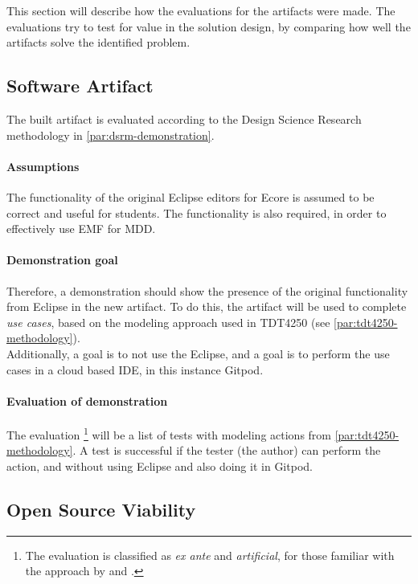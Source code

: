 
This section will describe how the evaluations for the artifacts were made.
The evaluations try to test for value in the solution design, by comparing how well the artifacts solve the identified problem.

\subsection{Software Artifact}

The built artifact is evaluated according to the Design Science Research methodology in \cref{par:dsrm-demonstration}.

\paragraph{Assumptions}
The functionality of the original \gls{Eclipse} editors for \gls{Ecore} is assumed to be correct and useful for students.
The functionality is also required, in order to effectively use \acrshort{EMF} for \acrfull{MDD}.

\paragraph{Demonstration goal}
Therefore, a demonstration should show the presence of the original functionality from \gls{Eclipse} in the new artifact.
To do this, the artifact will be used to complete \textit{use cases}, based on the modeling approach used in \gls{TDT4250} (see \cref{par:tdt4250-methodology}).\\


Additionally, a goal is to not use the \gls{Eclipse}, and a goal is to perform the use cases in a \gls{cloud} based \gls{IDE}, in this instance \gls{Gitpod}.


\paragraph{Evaluation of demonstration}
The evaluation%
\footnote{The evaluation is classified as \textit{ex ante} and \textit{artificial}, for those familiar with the approach by \textcite{sonnenbergEvaluationsScienceArtificial2012} and \cite{venableComprehensiveFrameworkEvaluation2012}.} 
will be a list of tests with modeling actions from \cref{par:tdt4250-methodology}.
A test is successful if the tester (the author) can perform the action, and without using \gls{Eclipse} and also doing it in \gls{Gitpod}.


\subsection{Open Source Viability}\label{sec:method-open-source}

